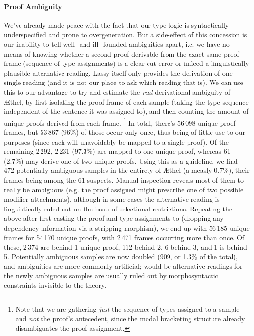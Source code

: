 \paragraph{Proof Ambiguity}
We've already made peace with the fact that our type logic is syntactically underspecified and prone to overgeneration.
But a side-effect of this concession is our inability to tell well- and ill- founded ambiguities apart, i.e. we have no means of knowing whether a second proof derivable from the exact same proof frame (sequence of type assignments) is a clear-cut error or indeed a linguistically plausible alternative reading.
Lassy itself only provides the derivation of one single reading (and it is not our place to ask which reading that is).
We can use this to our advantage to try and estimate the \textit{real} derivational ambiguity of \AE thel, by first isolating the proof frame of each sample (taking the type sequence independent of the sentence it was assigned to), and then counting the amount of unique proofs derived from each frame.%
	\footnote{Note that we are gathering \textit{just} the sequence of types assigned to a sample and \textit{not} the proof's antecedent, since the modal bracketing structure already disambiguates the proof assignment.}
In total, there's 56\,098 unique proof frames, but 53\,867 (96\%) of those occur only once, thus being of little use to our purposes (since each will unavoidably be mapped to a single proof).
Of the remaining 2\,292, 2\,231 (97.3\%) are mapped to one unique proof, whereas 61 (2.7\%) may derive one of two unique proofs.
Using this as a guideline, we find 472 potentially ambiguous samples in the entirety of \AE thel (a measly 0.7\%), their frames being among the 61 suspects.
Manual inspection reveals most of them to really be ambiguous (e.g. the proof assigned might prescribe one of two possible modifier attachments), 
although in some cases the alternative reading is linguistically ruled out on the basis of selectional restrictions.
Repeating the above after first casting the proof and type assignments to \NLP{} (dropping any dependency information via a stripping morphism), we end up with 56\,185 unique frames for 54\,170 unique proofs, with 2\,471 frames occurring more than once.
Of these, 2\,374 are behind 1 unique proof, 112 behind 2, 6 behind 3, and 1 is behind 5.
Potentially ambiguous samples are now doubled (909, or 1.3\% of the total), and ambiguities are more commonly artificial; would-be alternative readings for the newly ambiguous samples are usually ruled out by morphosyntactic constraints invisible to the theory.

